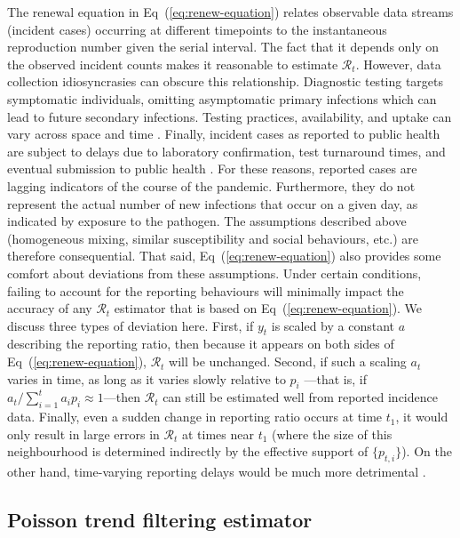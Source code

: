 \documentclass[10pt,letterpaper]{article}
\def\calR{\mathcal{R}}
\renewcommand{\eqref}[1]{Eq~(\ref{#1})}
\begin{document}
The renewal equation in \eqref{eq:renew-equation} relates observable data
streams (incident cases) occurring at different timepoints to the instantaneous
reproduction number given the serial interval. The fact that it depends only on
the observed incident counts makes it reasonable to estimate $\calR_t$. However,
data collection idiosyncrasies can obscure this relationship. Diagnostic testing
targets symptomatic individuals, omitting asymptomatic primary infections which
can lead to future secondary infections. Testing practices, availability, and
uptake can vary across space and time \cite{pitzer2021impact,
hitchings2021usefulness}. Finally, incident cases as reported to public health
are subject to delays due to laboratory confirmation, test turnaround times, and
eventual submission to public health \cite{pellis2021challenges}. For these
reasons, reported cases are lagging indicators of the course of the pandemic.
Furthermore, they do not represent the actual number of new infections that
occur on a given day, as indicated by exposure to the pathogen. The assumptions
described above (homogeneous mixing, similar susceptibility and social
behaviours, etc.) are therefore consequential. That said,
\eqref{eq:renew-equation} also provides some comfort about deviations from these
assumptions. Under certain conditions, failing to account for the reporting
behaviours will minimally impact the accuracy of any $\mathcal{R}_t$ estimator
that is based on \eqref{eq:renew-equation}. We discuss three types of deviation
here. First, if $y_t$ is scaled by a constant $a$ describing the reporting
ratio, then because it appears on both sides of \eqref{eq:renew-equation},
$\calR_t$ will be unchanged. Second, if such a scaling $a_t$ varies in time, as
long as it varies slowly relative to $p_i$ ---that is, if $a_t / \sum_{i = 1}^t
a_i p_i \approx 1$---then $\calR_t$ can still be estimated well from reported
incidence data. Finally, even a sudden change in reporting ratio occurs at time
$t_1$, it would only result in large errors in $\calR_t$ at times near $t_1$
(where the size of this neighbourhood is determined indirectly by the effective
support of $\{p_{t,i}\}$). On the other hand, time-varying reporting delays
would be much more detrimental \cite{EALES2024100742,park2024estimating}.


\subsection{Poisson trend filtering estimator} 
\end{document}
